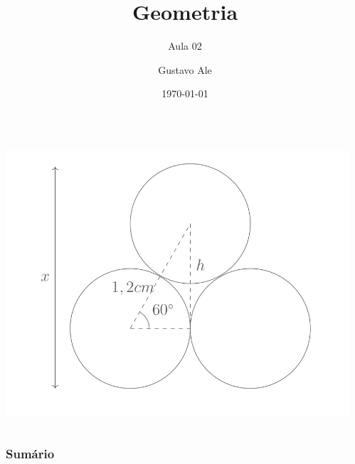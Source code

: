 \documentclass{beamer}
\title{Geometria} %
\subtitle{Aula 02}
\author{Gustavo Ale} %
\institute[UFMT] %
{
EduCursinho - Faculdade de Engenharia \\ %
\medskip
\textit{gustavo.engca@gmail.com} %
}
\date{\today} %
\begin{document}
{
\begin{frame}
    \begin{columns}
        \begin{column}{0.48\textwidth}
            \includegraphics[width=\columnwidth,left]{../assets/geo.png}
        \end{column}
        \begin{column}{0.48\textwidth}
            \titlepage
        \end{column}
    \end{columns}

\end{frame}
}


\begin{frame}
    \frametitle{Sumário} %
    \tableofcontents %
\end{frame}
\end{document}
